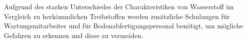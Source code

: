 %
Aufgrund des starken Unterschiedes der Charakteristiken von Wasserstoff 
im Vergleich zu herkömmlichen Treibstoffen werden zusätzliche Schulungen für 
Wartungsmitarbeiter und für Bodenabfertigungspersonal benötigt, 
um mögliche Gefahren zu erkennen und diese zu vermeiden.
%
%
%
%
%
%
